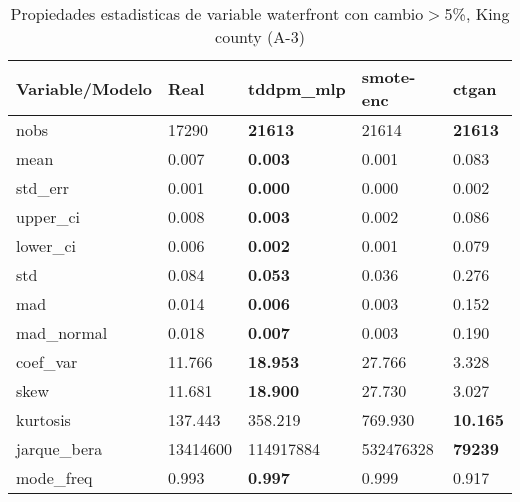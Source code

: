\begin{table}[H]
\centering
\fontsize{8}{14}\selectfont
\caption{Propiedades estadisticas de variable waterfront con cambio\ensuremath{>}5\%, King county (A-3)}
\label{table-stats-king county-a-3-waterfront-short}
\begin{tabular}{|l|m{10em}|m{10em}|m{10em}|m{10em}|}
\hline
 \rowcolor[gray]{0.8}
Variable/Modelo & Real & tddpm\_mlp & smote-enc & ctgan \\
\hline nobs & 17290 & \bfseries 21613 & \cellcolor[rgb]{0.9, 0.54, 0.52} 21614 & \bfseries 21613 \\
\hline mean & 0.007 & \bfseries 0.003 & 0.001 & \cellcolor[rgb]{0.9, 0.54, 0.52} 0.083 \\
\hline std\_err & 0.001 & \bfseries 0.000 & 0.000 & \cellcolor[rgb]{0.9, 0.54, 0.52} 0.002 \\
\hline upper\_ci & 0.008 & \bfseries 0.003 & 0.002 & \cellcolor[rgb]{0.9, 0.54, 0.52} 0.086 \\
\hline lower\_ci & 0.006 & \bfseries 0.002 & 0.001 & \cellcolor[rgb]{0.9, 0.54, 0.52} 0.079 \\
\hline std & 0.084 & \bfseries 0.053 & 0.036 & \cellcolor[rgb]{0.9, 0.54, 0.52} 0.276 \\
\hline mad & 0.014 & \bfseries 0.006 & 0.003 & \cellcolor[rgb]{0.9, 0.54, 0.52} 0.152 \\
\hline mad\_normal & 0.018 & \bfseries 0.007 & 0.003 & \cellcolor[rgb]{0.9, 0.54, 0.52} 0.190 \\
\hline coef\_var & 11.766 & \bfseries 18.953 & \cellcolor[rgb]{0.9, 0.54, 0.52} 27.766 & 3.328 \\
\hline skew & 11.681 & \bfseries 18.900 & \cellcolor[rgb]{0.9, 0.54, 0.52} 27.730 & 3.027 \\
\hline kurtosis & 137.443 & 358.219 & \cellcolor[rgb]{0.9, 0.54, 0.52} 769.930 & \bfseries 10.165 \\
\hline jarque\_bera & 13414600 & 114917884 & \cellcolor[rgb]{0.9, 0.54, 0.52} 532476328 & \bfseries 79239 \\
\hline mode\_freq & 0.993 & \bfseries 0.997 & 0.999 & \cellcolor[rgb]{0.9, 0.54, 0.52} 0.917 \\
\hline
\end{tabular}
\end{table}
